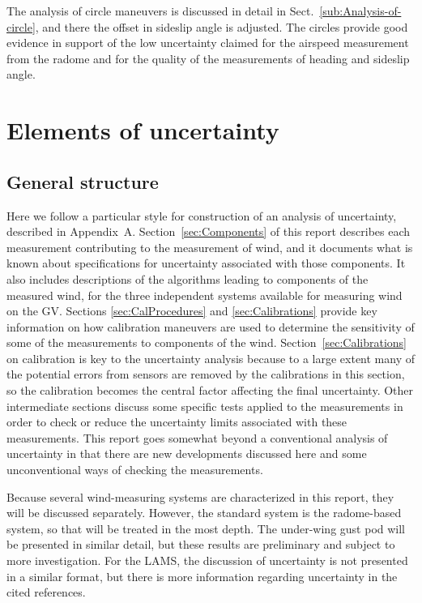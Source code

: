 \documentclass[12pt,twoside,english]{article}\usepackage[]{graphicx}\usepackage[]{color}
\let\stdsection\section
\renewcommand{\section}{\newpage\stdsection}
\let\OrgIndex\index
\renewcommand*{\index}[1]{\OrgIndex{#1}}
\begin{document}
{{The analysis of circle maneuvers is discussed in detail in Sect.~\ref{sub:Analysis-of-circle}, and there the offset in sideslip angle is adjusted. The circles provide good evidence in support of the low uncertainty claimed for the airspeed measurement from the radome and for the quality of the measurements of heading and sideslip angle. 





\section{Elements of uncertainty\label{sec:Uncertainty-components}}

\subsection{General structure}

Here we follow a particular style for construction of an analysis of uncertainty, described in Appendix~A. Section~\ref{sec:Components} of this report describes each measurement contributing to the measurement of wind, and it documents what is known about specifications for uncertainty associated with those components. It also includes descriptions of the algorithms leading to components of the measured wind, for the three independent systems available for measuring wind on the GV.  
Sections \ref{sec:CalProcedures} and \ref{sec:Calibrations} provide key information on how calibration maneuvers are used to determine the sensitivity of some of the measurements to components of the wind. Section~\ref{sec:Calibrations} on calibration is key to the uncertainty analysis because to a large extent many of the potential errors from sensors are removed by the calibrations in this section, so the calibration becomes the central factor affecting the final uncertainty. Other intermediate sections discuss some specific tests applied to the measurements in order to check or reduce the uncertainty limits associated with these measurements. This report goes somewhat beyond a conventional analysis of uncertainty in that there are new developments discussed here and some unconventional ways of checking the measurements.  

Because several wind-measuring systems are characterized in this report, they will be discussed separately. However, the standard system is the radome-based system, so that will be treated in the most depth. The under-wing gust pod will be presented in similar detail, but these results are preliminary and subject to more investigation. For the LAMS, the discussion of uncertainty is not presented in a similar format, but there is more information regarding uncertainty in the cited references. 

}}
\end{document}
